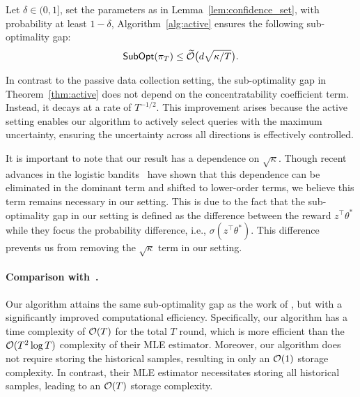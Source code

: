 \begin{myThm}
  \label{thm:active}
  Let $\delta \in(0,1]$, set the parameters as in Lemma~\ref{lem:confidence_set}, with probability at least $1-\delta$, Algorithm~\ref{alg:active} ensures the following sub-optimality gap:
  \begin{align*}
    \operatorname*{\mathsf{SubOpt}}(\pi_T)\leq \widetilde{\mathcal{O}} \big(d \sqrt{{\kappa}/{T}}\big).
  \end{align*}
\end{myThm}
\begin{myRemark}
  In contrast to the passive data collection setting, the sub-optimality gap in Theorem~\ref{thm:active} does not depend on the concentratability coefficient term. Instead, it decays at a rate of $T^{-1/2}$. This improvement arises because the active setting enables our algorithm to actively select queries with the maximum uncertainty, ensuring the uncertainty across all directions is effectively controlled.
\end{myRemark}
\begin{myRemark}
  It is important to note that our result has a dependence on $\sqrt{\kappa}$. Though recent advances in the logistic bandits~\citep{AISTATS'21:Abeille-Instance-optimal, NeurIPS'23:MLogB} have shown that this dependence can be eliminated in the dominant term and shifted to lower-order terms, we believe this term remains necessary in our setting. This is due to the fact that the sub-optimality gap in our setting is defined as the difference between the reward $z^\top \theta^*$ while they focus the probability difference, i.e., $\sigma(z^\top \theta^*)$. This difference prevents us from removing the $\sqrt{\kappa}$ term in our setting.
\end{myRemark}

\paragraph{Comparison with~\citet{arXiv'24:Das-RLHF-active}.} Our algorithm attains the same sub-optimality gap as the work of \citet{NeurIPS'21:Saha-Preference-bandits}, but with a significantly improved computational efficiency. Specifically, our algorithm has a time complexity of $\mathcal{O}(T)$ for the total $T$ round, which is more efficient than the $\mathcal{O}(T^2 \log T)$ complexity of their MLE estimator. Moreover, our algorithm does not require storing the historical samples, resulting in only an $\mathcal{O}(1)$ storage complexity. In contrast, their MLE estimator necessitates storing all historical samples, leading to an $\mathcal{O}(T)$ storage complexity.

